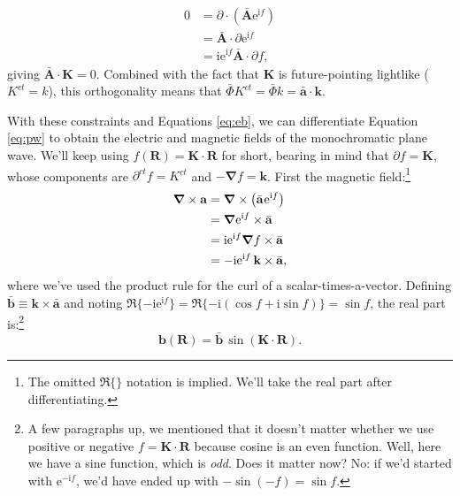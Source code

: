 \documentclass[12pt]{article}
\renewcommand{\vv}[1]{\mathbf{#1}}
\newcommand{\del}{\boldsymbol{\nabla}}
\begin{document}
\begin{equation*}
\begin{aligned}
0 &= \partialup \cdot \left( \bar{\vv A} \mathrm{e}^{\mathrm{i} f} \right) \\
&= \bar{\vv A} \cdot \partialup \mathrm{e}^{\mathrm{i} f} \\
&= \mathrm{i} \mathrm{e}^{\mathrm{i} f} \bar{\vv A} \cdot \partialup f ,
\end{aligned}
\end{equation*}
giving $\bar{\vv A} \cdot \vv K = 0$. Combined with the fact that $\vv K$ is future-pointing lightlike ($K^{ct} = k$), this orthogonality means that $\bar{\Phi} K^{ct} = \bar{\Phi} k = \bar{\vv a} \cdot \vv k$.

With these constraints and Equations \ref{eq:eb}, we can differentiate Equation \ref{eq:pw} to obtain the electric and magnetic fields of the monochromatic plane wave. We'll keep using $f(\vv R) = \vv K \cdot \vv R$ for short, bearing in mind that $\partialup f = \vv K$, whose components are $\partial^{ct} f = K^{ct}$ and $- \del f = \vv k$. First the magnetic field:\footnote{The omitted $\Re \lbrace \rbrace$ notation is implied. We'll take the real part after differentiating.}
\begin{equation*}
\begin{aligned}
\del \times \vv a &= \del \times \left( \bar{\vv a} \mkern1mu \mathrm{e}^{\mathrm{i} f} \right) \\
&= \del \mathrm{e}^{\mathrm{i} f} \times \bar{\vv a} \\
&= \mathrm{i} \mathrm{e}^{\mathrm{i} f} \del f \times \bar{\vv a} \\
&= - \mathrm{i} \mathrm{e}^{\mathrm{i} f} \, \vv k \times \bar{\vv a},
\end{aligned}
\end{equation*}
where we've used the product rule for the curl of a scalar-times-a-vector. Defining $\bar{\vv b} \equiv \vv k \times \bar{\vv a}$ and noting $\Re \lbrace - \mathrm{i} \mathrm{e}^{\mathrm{i} f} \rbrace = \Re \lbrace -\mathrm{i} ( \cos f + \mathrm{i} \sin f ) \rbrace = \sin f$, the real part is:\footnote{A few paragraphs up, we mentioned that it doesn't matter whether we use positive or negative $f = \vv K \cdot \vv R$ because cosine is an even function. Well, here we have a sine function, which is \emph{odd}. Does it matter now? No: if we'd started with $\mathrm{e}^{-\mathrm{i} f}$, we'd have ended up with $- \sin (-f) = \sin f$.}
\begin{equation}\label{eq:bpw}
\vv b (\vv R) = \bar{\vv b} \, \sin \left( \vv K \cdot \vv R \right) .
\end{equation}
\end{document}
